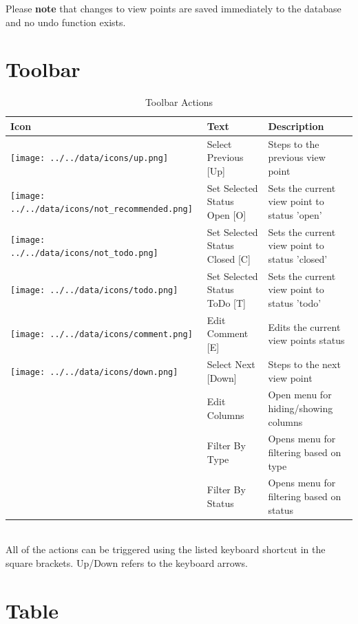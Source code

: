 Please \textbf{note} that changes to view points are saved immediately to the database and no undo function exists.

\section{Toolbar}

\begin{table}[H]
  \center
  \begin{tabular}{ | l | l | l |}
    \hline
    \textbf{Icon} & \textbf{Text} &  \textbf{Description} \\ \hline
    \texttt{[image: ../../data/icons/up.png]} & Select Previous [Up] & Steps to the previous view point \\ \hline
    \texttt{[image: ../../data/icons/not\_recommended.png]} & Set Selected Status Open [O] & Sets the current view point to status 'open' \\ \hline
    \texttt{[image: ../../data/icons/not\_todo.png]} & Set Selected Status Closed [C] & Sets the current view point to status 'closed' \\ \hline
    \texttt{[image: ../../data/icons/todo.png]} & Set Selected Status ToDo [T] & Sets the current view point to status 'todo' \\ \hline
    \texttt{[image: ../../data/icons/comment.png]} & Edit Comment [E] & Edits the current view points status \\ \hline
    \texttt{[image: ../../data/icons/down.png]} & Select Next [Down] & Steps to the next view point \\ \hline
    & Edit Columns & Open menu for hiding/showing columns \\ \hline
    & Filter By Type & Opens menu for filtering based on type \\ \hline
    & Filter By Status & Opens menu for filtering based on status \\ \hline
  \end{tabular}
  \caption{Toolbar Actions}
\end{table}
\ \\

All of the actions can be triggered using the listed keyboard shortcut in the square brackets. Up/Down refers to the keyboard arrows.

\section{Table}

